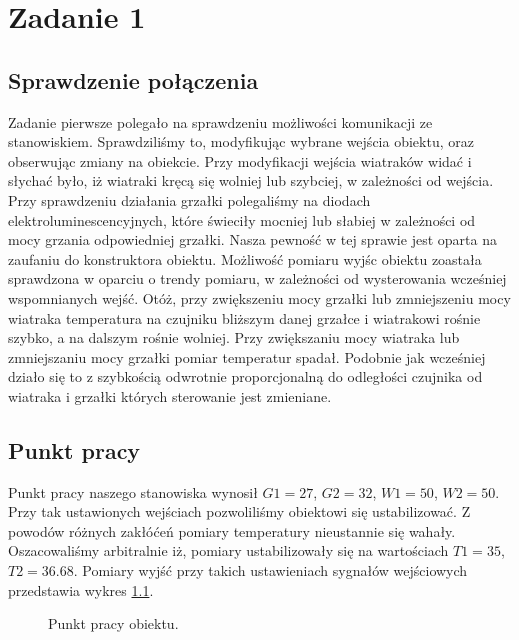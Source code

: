 \chapter{Zadanie 1}
\section{Sprawdzenie połączenia}
Zadanie pierwsze polegało na sprawdzeniu możliwości komunikacji ze stanowiskiem.
Sprawdziliśmy to, modyfikując wybrane wejścia obiektu, oraz obserwując zmiany
na obiekcie. Przy modyfikacji wejścia wiatraków widać i słychać było, iż wiatraki kręcą
się wolniej lub szybciej, w zależności od wejścia. Przy sprawdzeniu działania
grzałki polegaliśmy na diodach elektroluminescencyjnych, które świeciły mocniej
lub słabiej w zależności od mocy grzania odpowiedniej grzałki. Nasza pewność
w tej sprawie jest oparta na zaufaniu do konstruktora obiektu. Możliwość
pomiaru wyjśc obiektu zoastała sprawdzona w oparciu o trendy pomiaru,
w zależności od wysterowania wcześniej wspomnianych wejść. Otóż, przy
zwiększeniu mocy grzałki lub zmniejszeniu mocy wiatraka temperatura
na czujniku bliższym danej grzałce i wiatrakowi rośnie szybko, a na dalszym
rośnie wolniej. Przy zwiększaniu mocy wiatraka lub zmniejszaniu mocy grzałki pomiar
temperatur spadał. Podobnie jak wcześniej działo się to z szybkością odwrotnie proporcjonalną
do odległości czujnika od wiatraka i grzałki których sterowanie jest zmieniane.
\section{Punkt pracy}
Punkt pracy naszego stanowiska wynosił $G1 = 27$, $G2 = 32$, $W1 = 50$, $W2 = 50$.
Przy tak ustawionych wejściach pozwoliliśmy obiektowi się ustabilizować. Z powodów
różnych zakłóćeń pomiary temperatury nieustannie się wahały. Oszacowaliśmy
arbitralnie iż, pomiary ustabilizowały się na wartościach $T1 = 35$, $T2 = 36.68$.
Pomiary wyjść przy takich ustawieniach sygnałów wejściowych przedstawia wykres
\ref{fig:pkt_pracy}.

\begin{figure}[tb]
\centering
{}
\caption{Punkt pracy obiektu.}
\label{fig:pkt_pracy}
\end{figure}
